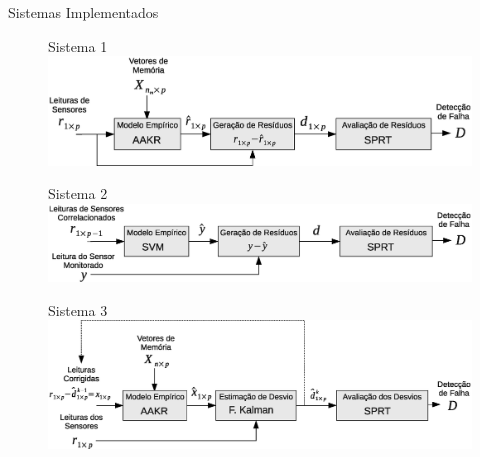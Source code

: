 \documentclass{beamer}
\begin{document}
\begin{frame}{Sistemas Implementados}

    \begin{figure}[!htb]
        \centering Sistema 1
        \includegraphics[width=.8\textwidth]{figuras/aakr_sprt.eps}
    \end{figure}
    
    \begin{figure}[!htb]
        \centering Sistema 2
        \includegraphics[width=.8\textwidth]{figuras/svm_sprt.eps}
    \end{figure}
    
    \begin{figure}[!htb]
        \centering Sistema 3
        \includegraphics[width=.8\textwidth]{figuras/aakr_kf_sprt.eps}
    \end{figure}
    

    \note{
    \begin{itemize}
        \item 
    \end{itemize}}
    
\end{frame}
\end{document}
